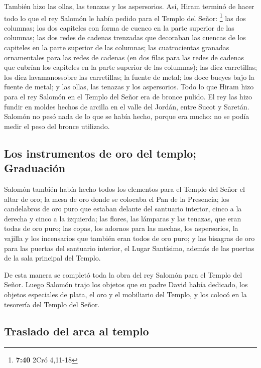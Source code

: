  También hizo las ollas, las tenazas y los aspersorios.
Así, Hiram terminó de hacer todo lo que el rey Salomón le había pedido
para el Templo del Señor: \footnote{\textbf{7:40} 2Cró 4,11-18}
 las dos columnas; los dos capiteles con forma de cuenco
en la parte superior de las columnas; las dos redes de cadenas trenzadas
que decoraban las cuencas de los capiteles en la parte superior de las
columnas;  las cuatrocientas granadas ornamentales para
las redes de cadenas (en dos filas para las redes de cadenas que cubrían
los capiteles en la parte superior de las columnas);  las
diez carretillas; los diez lavamanossobre las carretillas;
 la fuente de metal; los doce bueyes bajo la fuente de
metal;  y las ollas, las tenazas y los aspersorios. Todo
lo que Hiram hizo para el rey Salomón en el Templo del Señor era de
bronce pulido.  El rey las hizo fundir en moldes hechos
de arcilla en el valle del Jordán, entre Sucot y Saretán.
 Salomón no pesó nada de lo que se había hecho, porque
era mucho: no se podía medir el peso del bronce utilizado.

\hypertarget{los-instrumentos-de-oro-del-templo-graduaciuxf3n}{%
\subsection{Los instrumentos de oro del templo;
Graduación}\label{los-instrumentos-de-oro-del-templo-graduaciuxf3n}}

 Salomón también había hecho todos los elementos para el
Templo del Señor el altar de oro; la mesa de oro donde se colocaba el
Pan de la Presencia;  los candelabros de oro puro que
estaban delante del santuario interior, cinco a la derecha y cinco a la
izquierda; las flores, las lámparas y las tenazas, que eran todas de oro
puro;  las copas, los adornos para las mechas, los
aspersorios, la vajilla y los incensarios que también eran todos de oro
puro; y las bisagras de oro para las puertas del santuario interior, el
Lugar Santísimo, además de las puertas de la sala principal del Templo.

 De esta manera se completó toda la obra del rey Salomón
para el Templo del Señor. Luego Salomón trajo los objetos que su padre
David había dedicado, los objetos especiales de plata, el oro y el
mobiliario del Templo, y los colocó en la tesorería del Templo del
Señor.

\hypertarget{traslado-del-arca-al-templo}{%
\subsection{Traslado del arca al
templo}\label{traslado-del-arca-al-templo}}

